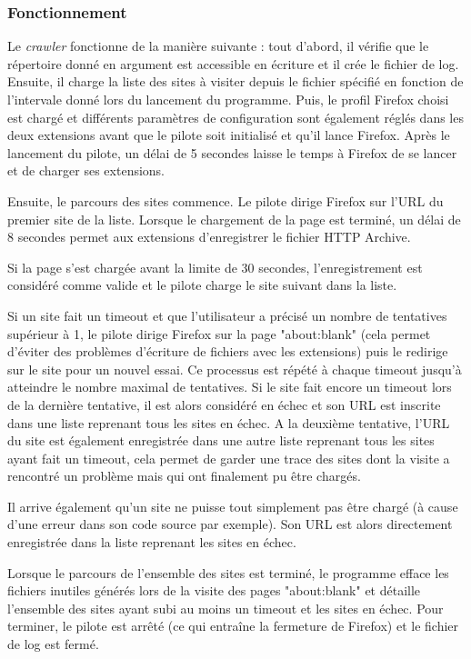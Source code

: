 \subsubsection{Fonctionnement}
Le \textit{crawler} fonctionne de la manière suivante : tout d'abord, il vérifie que le répertoire donné en argument est accessible en écriture et il crée le fichier de log. Ensuite, il charge la liste des sites à visiter depuis le fichier spécifié en fonction de l'intervale donné lors du lancement du programme. Puis, le profil Firefox choisi est chargé et différents paramètres de configuration sont également réglés dans les deux extensions avant que le pilote soit initialisé et qu'il lance Firefox. Après le lancement du pilote, un délai de 5 secondes laisse le temps à Firefox de se lancer et de charger ses extensions.
\newline

Ensuite, le parcours des sites commence. Le pilote dirige Firefox sur l'URL du premier site de la liste. Lorsque le chargement de la page est terminé, un délai de 8 secondes permet aux extensions d'enregistrer le fichier HTTP Archive.

Si la page s'est chargée avant la limite de 30 secondes, l'enregistrement est considéré comme valide et le pilote charge le site suivant dans la liste.

Si un site fait un timeout et que l'utilisateur a précisé un nombre de tentatives supérieur à 1, le pilote dirige Firefox sur la page "about:blank" (cela permet d'éviter des problèmes d'écriture de fichiers avec les extensions) puis le redirige sur le site pour un nouvel essai. Ce processus est répété à chaque timeout jusqu'à atteindre le nombre maximal de tentatives. Si le site fait encore un timeout lors de la dernière tentative, il est alors considéré en échec et son URL est inscrite dans une liste reprenant tous les sites en échec. A la deuxième tentative, l'URL du site est également enregistrée dans une autre liste reprenant tous les sites ayant fait un timeout, cela permet de garder une trace des sites dont la visite a rencontré un problème mais qui ont finalement pu être chargés. 

Il arrive également qu'un site ne puisse tout simplement pas être chargé (à cause d'une erreur dans son code source par exemple). Son URL est alors directement enregistrée dans la liste reprenant les sites en échec.
\newline

Lorsque le parcours de l'ensemble des sites est terminé, le programme efface les fichiers inutiles générés lors de la visite des pages "about:blank" et détaille l'ensemble des sites ayant subi au moins un timeout et les sites en échec. Pour terminer, le pilote est arrêté (ce qui entraîne la fermeture de Firefox) et le fichier de log est fermé.
\newline

